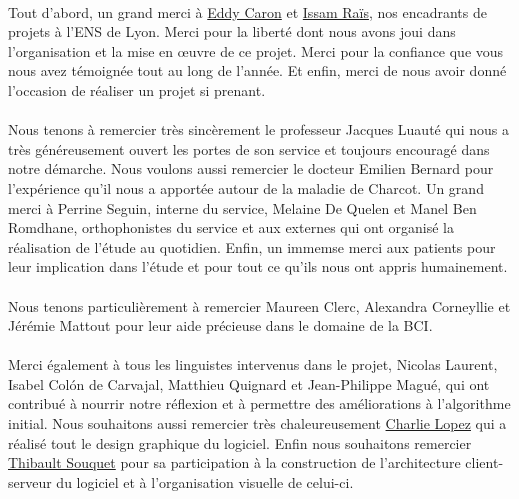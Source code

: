 \documentclass[11pt,a4paper]{article}
\theoremstyle{plain}
\theoremstyle{definition}
\begin{document}
\paragraph{}Tout d'abord, un grand merci à \href{http://graal.ens-lyon.fr/~ecaron/}{Eddy Caron} et \href{http://perso.ens-lyon.fr/issam.rais/}{Issam Raïs}, nos encadrants de projets à
l'ENS de Lyon. Merci pour la liberté dont nous avons joui dans l'organisation et la mise en \oe uvre de ce projet. Merci pour la confiance que vous nous avez témoignée tout au long de l'année.
Et enfin, merci de nous avoir donné l'occasion de réaliser un projet si prenant.

\paragraph{}
Nous tenons à remercier très sincèrement le professeur Jacques Luauté qui nous a très généreusement ouvert les portes de son service et toujours encouragé dans notre démarche.
Nous voulons aussi remercier le docteur Emilien Bernard pour l'expérience qu'il nous a apportée autour de la maladie de Charcot. Un grand merci à Perrine Seguin, interne 
du service, Melaine De Quelen et Manel Ben Romdhane, orthophonistes du service et aux externes qui ont organisé la réalisation de l'étude au quotidien. Enfin, un immemse merci
aux patients pour leur implication dans l'étude et pour tout ce qu'ils nous ont appris humainement.

\paragraph{}
Nous tenons particulièrement à remercier Maureen Clerc, Alexandra Corneyllie et Jérémie Mattout pour leur aide précieuse dans le domaine de la BCI.

\paragraph{}
Merci également à tous les linguistes intervenus dans le projet, Nicolas Laurent, Isabel Colón de Carvajal, Matthieu Quignard et Jean-Philippe Magué, qui ont contribué à nourrir notre réflexion et à permettre 
des améliorations à l'algorithme initial. Nous souhaitons aussi remercier très chaleureusement \href{http://www.charlie-lopez.com/}{Charlie Lopez} 
qui a réalisé tout le design graphique du logiciel. Enfin nous souhaitons remercier \href{http://thibaultsouquet.fr/}{Thibault Souquet} pour sa participation à la construction 
de l'architecture client-serveur du logiciel et à l'organisation visuelle de celui-ci.
\end{document}
